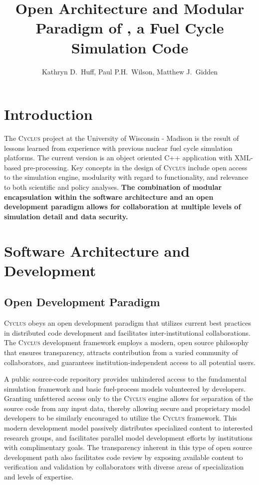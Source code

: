 \documentclass{anstrans}
\title{Open Architecture and Modular Paradigm of \Cyclus, a Fuel Cycle Simulation Code}
\author{Kathryn D.~Huff, Paul P.H.~Wilson, Matthew J.~Gidden}
\institute{Department of Nuclear Engineering \& Engineering Physics, University of Wisconsin, Madison, WI, 53706}
\date{}
\newcommand{\Cyclus}{\textsc{Cyclus }}
\begin{document}
\section{Introduction}
The \Cyclus project at the University of Wisconsin - Madison is the result of lessons learned from experience with previous nuclear fuel cycle simulation platforms. The current version is an object oriented C++ application with XML-based pre-processing. Key concepts in the design of \Cyclus include open access to the simulation engine, modularity with regard to functionality, and relevance to both scientific and policy analyses. \textbf{The combination of modular encapsulation within the software architecture and an open development paradigm allows for collaboration at multiple levels of simulation detail and data security.}

\section{Software Architecture and Development}

\subsection{Open Development Paradigm}
\Cyclus obeys an open development paradigm that utilizes current best practices in distributed code development and facilitates inter-institutional collaborations. The \Cyclus development framework employs a modern, open source philosophy that ensures transparency, attracts contribution from a varied community of collaborators, and guarantees institution-independent access to all potential users. 

A public source-code repository provides unhindered access to the fundamental simulation framework and basic fuel-process models volunteered by developers. Granting unfettered access only to the \Cyclus engine allows for separation of the source code from any input data, thereby allowing secure and proprietary model developers to be similarly encouraged to utilize the \Cyclus framework. This modern development model passively distributes specialized content to interested research groups, and facilitates parallel model development efforts by institutions with complimentary goals. The transparency inherent in this type of open source development path also facilitates code review by exposing available content to verification and validation by collaborators with diverse areas of specialization and levels of expertise.
\end{document}
